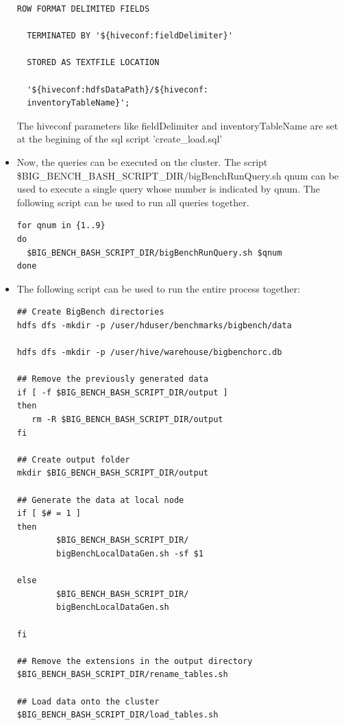 \documentclass[12pt]{book}
\begin{document}
\begin{itemize}
\begin{lstlisting}[caption="Populate Hive Tables",frame=single]
  ROW FORMAT DELIMITED FIELDS 
  
  TERMINATED BY '${hiveconf:fieldDelimiter}'
  
  STORED AS TEXTFILE LOCATION 
  
  '${hiveconf:hdfsDataPath}/${hiveconf:
  inventoryTableName}';
\end{lstlisting}
The hiveconf parameters like fieldDelimiter and inventoryTableName are set at the begining of the sql script 'create\_load.sql'

\item Now, the queries can be executed on the cluster. The script \$BIG\_BENCH\_BASH\_SCRIPT\_DIR/bigBenchRunQuery.sh qnum can be used
to execute a single query whose number is indicated by qnum. The following script can be used to run all queries together.

\lstset{language=sh,basicstyle=\ttfamily,showspaces=false, showstringspaces=false}
\begin{lstlisting}[caption="Run the Workload",frame=single]
for qnum in {1..9}
do
  $BIG_BENCH_BASH_SCRIPT_DIR/bigBenchRunQuery.sh $qnum
done
\end{lstlisting}

\item The following script can be used to run the entire process together:
\lstset{language=sh,basicstyle=\ttfamily,showspaces=false, showstringspaces=false}
\begin{lstlisting}[caption="Run the Benchmark",frame=single]
## Create BigBench directories
hdfs dfs -mkdir -p /user/hduser/benchmarks/bigbench/data

hdfs dfs -mkdir -p /user/hive/warehouse/bigbenchorc.db

## Remove the previously generated data
if [ -f $BIG_BENCH_BASH_SCRIPT_DIR/output ]
then
   rm -R $BIG_BENCH_BASH_SCRIPT_DIR/output
fi

## Create output folder
mkdir $BIG_BENCH_BASH_SCRIPT_DIR/output

## Generate the data at local node
if [ $# = 1 ]
then
        $BIG_BENCH_BASH_SCRIPT_DIR/
        bigBenchLocalDataGen.sh -sf $1
        
else
        $BIG_BENCH_BASH_SCRIPT_DIR/
        bigBenchLocalDataGen.sh
        
fi

## Remove the extensions in the output directory
$BIG_BENCH_BASH_SCRIPT_DIR/rename_tables.sh

## Load data onto the cluster
$BIG_BENCH_BASH_SCRIPT_DIR/load_tables.sh


\end{lstlisting}
\end{itemize}
\end{document}
